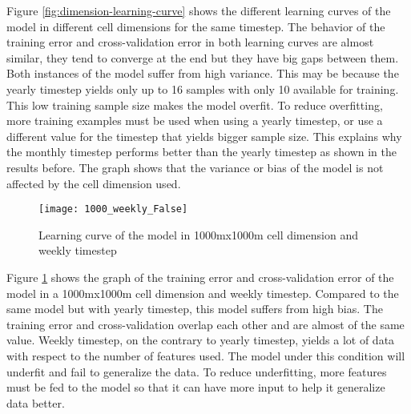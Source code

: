     Figure \ref{fig:dimension-learning-curve} shows the different learning curves of the model in different cell dimensions for the same timestep. The behavior of the training error and cross-validation error in both learning curves are almost similar, they tend to converge at the end but they have big gaps between them. Both instances of the model suffer from high variance. This may be because the yearly timestep yields only up to 16 samples with only 10 available for training. This low training sample size makes the model overfit. To reduce overfitting, more training examples must be used when using a yearly timestep, or use a different value for the timestep that yields bigger sample size. This explains why the monthly timestep performs better than the yearly timestep as shown in the results before. The graph shows that the variance or bias of the model is not affected by the cell dimension used.

    \begin{figure}[H]
      \centering
      \texttt{[image: 1000\_weekly\_False]}
      \caption{Learning curve of the model in 1000mx1000m cell dimension and weekly timestep}
      \label{fig:learning-curve2}
    \end{figure}
    Figure \ref{fig:learning-curve2} shows the graph of the training error and cross-validation error of the model in a 1000mx1000m cell dimension and weekly timestep. Compared to the same model but with yearly timestep, this model suffers from high bias. The training error and cross-validation overlap each other and are almost of the same value. Weekly timestep, on the contrary to yearly timestep, yields a lot of data with respect to the number of features used. The model under this condition will underfit and fail to generalize the data. To reduce underfitting, more features must be fed to the model so that it can have more input to help it generalize data better.
